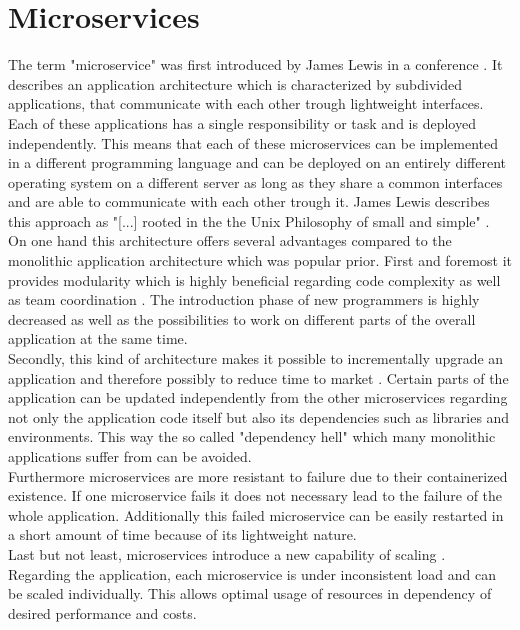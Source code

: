 \documentclass[
	ngerman,
	ruledheaders=section,%
	class=report,%
	thesis={type=master},%
	accentcolor=8c,%
	custommargins=false,%
	marginpar=false,%
	parskip=half-,%
	fontsize=11pt,%
]{tudapub}
\begin{document}
\section{Microservices}
The term "microservice" was first introduced by James Lewis in a conference \cite{lewis2012microservices}. It describes an application architecture which is characterized by subdivided applications, that communicate with each other trough lightweight interfaces.\\ 
Each of these applications has a single responsibility or task and is deployed independently. This means that each of these microservices can be implemented in a different programming language and can be deployed on an entirely different operating system on a different server as long as they share a common interfaces and are able to communicate with each other trough it. James Lewis describes this approach as "[...] rooted in the the Unix Philosophy of small and simple" \cite{lewis2012microservices}.\\

On one hand this architecture offers several advantages compared to the monolithic application architecture which was popular prior.
First and foremost it provides modularity which is highly beneficial regarding code complexity as well as team coordination \cite{dragoni2017microservices}. The introduction phase of new programmers is highly decreased as well as the possibilities to work on different parts of the overall application at the same time.\\
Secondly, this kind of architecture makes it possible to incrementally upgrade an application and therefore possibly to reduce time to market \cite{dragoni2017microservices}. Certain parts of the application can be updated independently from the other microservices regarding not only the application code itself but also its dependencies such as libraries and environments. This way the so called "dependency hell" \cite{merkel2014docker} which many monolithic applications suffer from can be avoided.\\
Furthermore microservices are more resistant to failure due to their containerized existence. If one microservice fails it does not necessary lead to the failure of the whole application. Additionally this failed microservice can be easily restarted in a short amount of time because of its lightweight nature.\\
Last but not least, microservices introduce a new capability of scaling \cite{dragoni2017microservices, namiot2014micro}. Regarding the application, each microservice is under inconsistent load and can be scaled individually. This allows optimal usage of resources in dependency of desired performance and costs.\\
\end{document}
